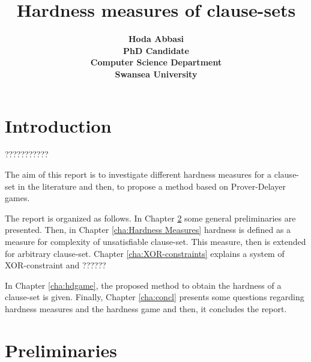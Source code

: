 \documentclass[12pt]{book}
\begin{document}
\title{\bf \Huge Hardness measures of clause-sets}

\author{ \bf Hoda Abbasi\\
             PhD Candidate\\
             Computer Science Department\\
             Swansea University\\}
\maketitle
\tableofcontents

\chapter{Introduction}
\label{cha:Introduction}

???????????

The aim of this report is to investigate different hardness measures for a clause-set in the literature and then, 
to propose a method based on Prover-Delayer games. 

The report is organized as follows. In Chapter \ref{cha:Preliminaries} some general preliminaries are presented.
Then, in Chapter \ref{cha:Hardness Measures} hardness is defined as a measure for complexity of unsatisfiable clause-set.
This measure, then is extended for arbitrary clause-set. 
Chapter \ref{cha:XOR-constraints} explains a system of XOR-constraint and ??????

In Chapter \ref{cha:hdgame}, the proposed method to obtain the hardness of a clause-set is given.
Finally, Chapter \ref{cha:concl} presents some questions regarding hardness measures and the hardness game and then, it concludes the report.
\chapter{Preliminaries}
\label{cha:Preliminaries}
\end{document}
